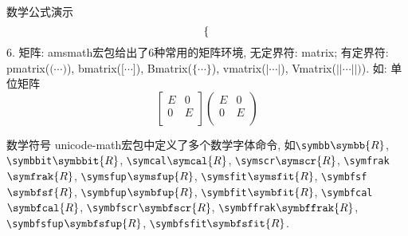 \documentclass[hyperref, UTF8, CJK, aspectratio=169]{beamer}
\begin{document}
\begin{frame}{数学公式演示}
\begin{equation}
\begin{dcases}
			\end{dcases}
		\end{equation}
	{\color{univred}6. 矩阵:} amsmath宏包给出了6种常用的矩阵环境, 无定界符: {\color{univred}matrix}; 有定界符: {\color{univred}pmatrix}($\big(\cdots\big)$), {\color{univred}bmatrix}($\big[\cdots\big]$), {\color{univred}Bmatrix}($\bigl\{\cdots\bigr\}$), {\color{univred}vmatrix}($|\cdots|$), {\color{univred}Vmatrix}($||\cdots||)$).
	如: 单位矩阵
		\[
		\begin{bmatrix}
		E & 0 \\
		0 & E \\
		\end{bmatrix}
		\begin{pmatrix}
			E & 0 \\
			0 & E \\
		\end{pmatrix}
		\]
\end{frame}

\begin{frame}[fragile]{数学符号}
  unicode-math宏包中定义了多个数学字体命令, 如\verb|\symbb|$\symbb{R}$, \verb|\symbbit|$\symbbit{R}$, \verb|\symcal|$\symcal{R}$, \verb|\symscr|$\symscr{R}$, \verb|\symfrak|$\symfrak{R}$, \verb|\symsfup|$\symsfup{R}$, \verb|\symsfit|$\symsfit{R}$, \verb|\symbfsf|$\symbfsf{R}$, \verb|\symbfup|$\symbfup{R}$, \verb|\symbfit|$\symbfit{R}$, \verb|\symbfcal|$\symbfcal{R}$, \verb|\symbfscr|$\symbfscr{R}$, \verb|\symbffrak|$\symbffrak{R}$, \verb|\symbfsfup|$\symbfsfup{R}$, \verb|\symbfsfit|$\symbfsfit{R}$.\\
\end{frame}
\end{document}
